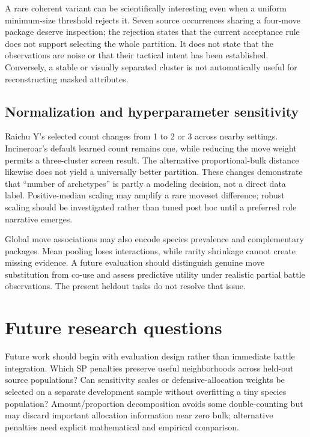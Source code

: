 \documentclass[10pt,a4paper]{article}
\begin{document}
A rare coherent variant can be scientifically interesting even when a uniform minimum-size threshold rejects it. Seven source occurrences sharing a four-move package deserve inspection; the rejection states that the current acceptance rule does not support selecting the whole partition. It does not state that the observations are noise or that their tactical intent has been established. Conversely, a stable or visually separated cluster is not automatically useful for reconstructing masked attributes.

\subsection{Normalization and hyperparameter sensitivity}
\begin{table}[!ht]\centering\small
\caption{Conservative selected $K$ under the fixed sensitivity grid. The entries describe the saved screen, not an optimization outcome. ``Proportion'' replaces the defensive decomposition; dimension settings change only the retained SVD dimensions.}
\SensitivityTable
\end{table}
Raichu Y's selected count changes from 1 to 2 or 3 across nearby settings. Incineroar's default learned count remains one, while reducing the move weight permits a three-cluster screen result. The alternative proportional-bulk distance likewise does not yield a universally better partition. These changes demonstrate that ``number of archetypes'' is partly a modeling decision, not a direct data label. Positive-median scaling may amplify a rare moveset difference; robust scaling should be investigated rather than tuned post hoc until a preferred role narrative emerges.

Global move associations may also encode species prevalence and complementary packages. Mean pooling loses interactions, while rarity shrinkage cannot create missing evidence. A future evaluation should distinguish genuine move substitution from co-use and assess predictive utility under realistic partial battle observations. The present heldout tasks do not resolve that issue.
\clearpage

\section{Future research questions}
Future work should begin with evaluation design rather than immediate battle integration. Which SP penalties preserve useful neighborhoods across held-out source populations? Can sensitivity scales or defensive-allocation weights be selected on a separate development sample without overfitting a tiny species population? Amount/proportion decomposition avoids some double-counting but may discard important allocation information near zero bulk; alternative penalties need explicit mathematical and empirical comparison.
\end{document}
